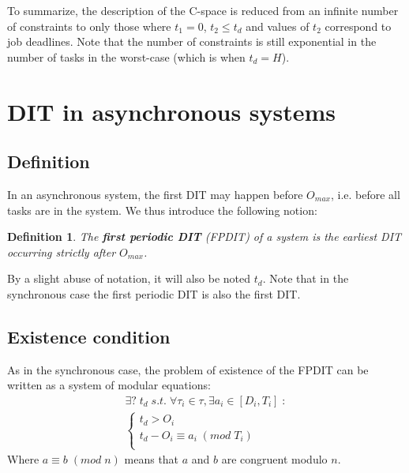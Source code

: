 \documentclass[conference]{IEEEtran}
\newtheorem{definition}{Definition}
\begin{document}
  To summarize, the description of the C-space is reduced from an infinite number
  of constraints to only those where $t_1 = 0$, $t_2 \leqslant t_d$ and
  values of $t_2$ correspond to job deadlines. Note that the number of
  constraints is still exponential in the number of tasks in the worst-case (which is when $t_d = H$).

\section{DIT in asynchronous systems}
  \label{sct:asyncDIT}

  \subsection{Definition}

    In an asynchronous system, the first DIT may happen before $O_{max}$, i.e. before all tasks are in the system. We thus introduce the following notion:

    \begin{definition}
      The \textbf{first periodic DIT} (FPDIT) of a system is the earliest DIT occurring
      strictly after $O_{max}$.
    \end{definition}

    By a slight abuse of notation, it will also be noted $t_d$. Note that in the
    synchronous case the first periodic DIT is also the first DIT.

	\subsection{Existence condition}
	\label{sct:FPDITexist}
		As in the synchronous case, the problem of existence of the FPDIT
		can be written as a system of modular equations:
		\begin{equation}
			\begin{array}{l}
				\exists ? \; t_d \; s.t. \; \forall \tau_i \in \tau, \exists a_i \in [D_i,
				T_i] \; :\\
				\left\{
					\begin{array}{l}
						t_d > O_i \\
						t_d - O_i \equiv a_i \; (mod \;	T_i)
						\\
					\end{array}
				\right.
			\end{array}
		\end{equation}
        Where $a \equiv b \; (mod \; n)$ means that $a$ and $b$ are congruent modulo $n$.
\end{document}
